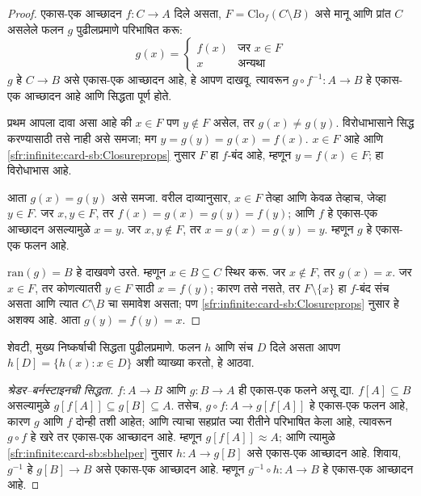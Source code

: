 \documentclass[11pt,a4paper,openany]{book}
\theoremstyle{definition}
\newcommand{\Setabs}[2]{\{#1:#2\}}
\newcommand{\funimage}[2]{#1[#2]}
\newcommand{\ran}[1]{\mathrm{ran}(#1)}
\newcommand{\comp}[2]{#2\circ #1}
\newcommand{\cardeq}[2]{#1 \approx #2}
\newcommand{\Closureofunder}[2]{\mathrm{Clo}_{#1}(#2)}
\begin{document}
\begin{proof}
एकास-एक आच्छादन  $f \colon C \to A$ दिले असता, $F =
\Closureofunder{f}{C \setminus B}$ असे मानू आणि प्रांत $C$ असलेले फलन
$g$ पुढीलप्रमाणे परिभाषित करू:
\[
	g(x) =
	\begin{cases}
			f(x) &\text{जर $x \in F$}\\
			x & \text{अन्यथा}
	\end{cases}
\]
$g$ हे $C \to B$ असे एकास-एक आच्छादन आहे, हे आपण दाखवू. त्यावरून
$\comp{f^{-1}}{g} \colon A \to B$ हे एकास-एक आच्छादन आहे आणि सिद्धता
पूर्ण होते.

प्रथम आपला दावा असा आहे की $x \in F$ पण $y\notin F$ असेल, तर $g(x) \neq
g(y)$. विरोधाभासाने सिद्ध करण्यासाठी तसे नाही असे समजा; मग $y = g(y) =
g(x) = f(x)$. $x \in F$ आहे आणि \ref{sfr:infinite:card-sb:Closureprops} नुसार $F$ हा
$f$-बंद आहे, म्हणून $y = f(x) \in F$; हा विरोधाभास आहे.

आता $g(x) = g(y)$ असे समजा. वरील दाव्यानुसार, $x \in F$ तेव्हा आणि
केवळ तेव्हाच, जेव्हा $y \in F$. जर $x, y \in F$, तर $f(x) = g (x) =
g(y) = f(y)$; आणि $f$ हे एकास-एक आच्छादन असल्यामुळे $x = y$. जर
$x, y \notin F$, तर $x = g(x) = g(y) = y$. म्हणून $g$ हे
एकास-एक फलन आहे.

$\ran{g} = B$ हे दाखवणे उरते. म्हणून $x \in B \subseteq C$ स्थिर करू.
जर $x \notin F$, तर $g(x) = x$. जर $x \in F$, तर कोणत्यातरी
$y \in F$ साठी $x = f(y)$; कारण तसे नसते, तर $F \setminus \{x\}$ हा
$f$-बंद संच असता आणि त्यात $C\setminus B$ चा समावेश असता; पण
\ref{sfr:infinite:card-sb:Closureprops} नुसार हे अशक्य आहे. आता $g(y) = f(y) = x$.
\end{proof}

शेवटी, मुख्य निष्कर्षाची सिद्धता पुढीलप्रमाणे. फलन $h$ आणि संच $D$ दिले
असता आपण $\funimage{h}{D} = \Setabs{h(x)}{x \in D}$ अशी व्याख्या करतो,
हे आठवा.

\begin{proof}[श्रेडर--बर्नस्टाइनची सिद्धता] $f \colon A \to B$
आणि $g \colon B \to A$ ही एकास-एक फलने असू द्या.
$\funimage{f}{A} \subseteq B$ असल्यामुळे
$\funimage{g}{\funimage{f}{A}} \subseteq g[B] \subseteq A$.
तसेच, $\comp{f}{g} \colon A \to
\funimage{g}{\funimage{f}{A}}$ हे एकास-एक फलन आहे, कारण $g$ आणि
$f$ दोन्ही तशी आहेत; आणि त्याचा सहप्रांत ज्या रीतीने परिभाषित केला आहे,
त्यावरून $\comp{f}{g}$ हे खरे तर एकास-एक आच्छादन आहे. म्हणून
$\cardeq{\funimage{g}{\funimage{f}{A}}}{A}$; आणि त्यामुळे
\ref{sfr:infinite:card-sb:sbhelper} नुसार $h \colon A \to \funimage{g}{B}$ असे
एकास-एक आच्छादन आहे. शिवाय, $g^{-1}$ हे
$\funimage{g}{B} \to B$ असे एकास-एक आच्छादन आहे. म्हणून
$\comp{h}{g^{-1}} \colon A \to B$ हे एकास-एक आच्छादन आहे.
\end{proof}
\end{document}
